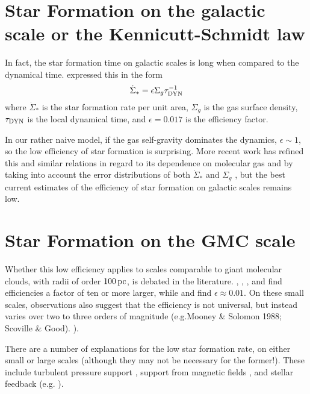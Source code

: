 \documentclass[../dissertation.tex]{subfiles}
\begin{document}
\section{Star Formation on the galactic scale or the Kennicutt-Schmidt law}
In fact, the star formation time on galactic scales is long when compared to the dynamical time. 
\citet{1998ApJ...498..541K} expressed this in the form
%
\begin{equation}\label{eq:intro_KS_law}
\dot{\Sigma}_* = \epsilon\Sigma_g \tau_{\rm DYN}^{-1}
\end{equation}
%
where $\dot{\Sigma}_*$ is the star formation rate per unit area, $\Sigma_g$ is the 
gas surface density, $\tau_{\rm DYN}$ is the local dynamical time, and $\epsilon = 0.017$ 
is the efficiency factor.  

In our rather naive model, if the gas self-gravity dominates the dynamics, $\epsilon \sim 1$, so the low efficiency of star formation is surprising. 
More recent work has refined this and similar relations in regard to its dependence on molecular gas \citep{2008AJ....136.2846B} and by taking into account the error distributions of both $\dot\Sigma_*$ and $\Sigma_g$ \citep{2013MNRAS.430..288S}, but the best current estimates of the efficiency of star formation on galactic scales remains low. 

\section{Star Formation on the GMC scale}
Whether this low efficiency applies to scales comparable to giant molecular clouds, with radii of
order $100\,\rm pc$, is debated in the literature.
\citet{2010ApJ...723.1019H}, \citet{2010ApJ...724..687L}, \citet{2010ApJS..188..313W}, and \citet{2011ApJ...729..133M} 
find efficiencies a factor of ten or more larger, while \citet{2007ApJ...654..304K} and \citet{2012ApJ...745...69K} 
find $\epsilon\approx0.01$.
On these small scales, observations also suggest that the efficiency is not universal, but instead 
varies over two to three orders of magnitude (e.g.Mooney \& Solomon 1988; Scoville \& Good).  
\citealt{1988ApJ...334L..51M,2016ApJ...833..229L}).%

There are a number of explanations for the low star formation rate, on 
either small or large scales (although they may not be necessary for the former!). 
These include turbulent pressure support \citep{1992ApJ...396..631M}, support from magnetic fields
\citep{1966MNRAS.132..359S,1976ApJ...207..141M}, and stellar feedback (e.g.
\citealt{1986ApJ...303...39D}).  
\end{document}
